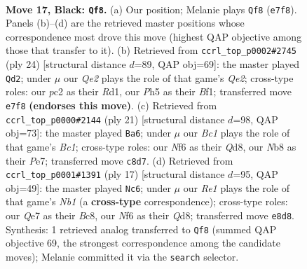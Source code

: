 \documentclass[11pt]{article}
\begin{document}
\clearpage

\begin{figure}[p]\centering
\begin{subfigure}{0.46\textwidth}\centering
\resizebox{\linewidth}{!}{%
\newchessgame
\chessboard[
  setfen={rnb1r1k1/pp2qpb1/4pnp1/1Q1p3p/P2P4/1B3NPP/RPP2P1K/1NB1R3 b - - 3 17},
  showmover=false,
  pgfstyle=straightmove, color=movearrow, markmove={e7-f8}
]}
\caption{}
\end{subfigure}\hfill
\begin{subfigure}{0.46\textwidth}\centering
\resizebox{\linewidth}{!}{%
\newchessgame
\chessboard[
  setfen={rnb1k1r1/2p1bp1p/p3p3/3q1p2/Np1P4/1P3N2/P1P1QPPP/2KR1B1R w q - 1 13},
  showmover=false,
  pgfstyle=straightmove, color=movearrow, markmove={e2-d2}
]}
\caption{}
\end{subfigure}
\\[4pt]
\begin{subfigure}{0.46\textwidth}\centering
\resizebox{\linewidth}{!}{%
\newchessgame
\chessboard[
  setfen={r1bqk2r/p2pppbp/1p2n1p1/3Q4/2P1P3/2N1B3/PP3PPP/2R1KB1R b Kkq - 1 11},
  showmover=false,
  pgfstyle=straightmove, color=movearrow, markmove={c8-a6}
]}
\caption{}
\end{subfigure}\hfill
\begin{subfigure}{0.46\textwidth}\centering
\resizebox{\linewidth}{!}{%
\newchessgame
\chessboard[
  setfen={rnbq1rk1/1p2ppbp/p4np1/3p4/3P1B1P/1QN1PN2/PP3PP1/R3KB1R b KQ - 0 9},
  showmover=false,
  pgfstyle=straightmove, color=movearrow, markmove={b8-c6}
]}
\caption{}
\end{subfigure}
\caption{\textbf{Move 17, Black: \texttt{Qf8}.} (a) Our position; Melanie plays \texttt{Qf8} (\texttt{e7f8}). Panels (b)--(d) are the retrieved master positions whose correspondence most drove this move (highest QAP objective among those that transfer to it). (b) Retrieved from \texttt{ccrl\_top\_p0002\#2745} (ply 24) [structural distance $d$=89, QAP obj=69]: the master played \texttt{Qd2}; under $\mu$ our \emph{Qe2} plays the role of that game's \emph{Qe2}; cross-type roles: our \emph{p}c2 as their \emph{R}d1, our \emph{P}h5 as their \emph{B}f1; transferred move \texttt{e7f8} \textbf{(endorses this move)}. (c) Retrieved from \texttt{ccrl\_top\_p0000\#2144} (ply 21) [structural distance $d$=98, QAP obj=73]: the master played \texttt{Ba6}; under $\mu$ our \emph{Bc1} plays the role of that game's \emph{Bc1}; cross-type roles: our \emph{N}f6 as their \emph{Q}d8, our \emph{N}b8 as their \emph{P}e7; transferred move \texttt{c8d7}. (d) Retrieved from \texttt{ccrl\_top\_p0001\#1391} (ply 17) [structural distance $d$=95, QAP obj=49]: the master played \texttt{Nc6}; under $\mu$ our \emph{Re1} plays the role of that game's \emph{Nb1} (a \textbf{cross-type} correspondence); cross-type roles: our \emph{Q}e7 as their \emph{B}c8, our \emph{N}f6 as their \emph{Q}d8; transferred move \texttt{e8d8}. Synthesis: 1 retrieved analog transferred to \texttt{Qf8} (summed QAP objective 69, the strongest correspondence among the candidate moves); Melanie committed it via the \texttt{search} selector.}
\label{fig:thought-m33}
\end{figure}
\end{document}
